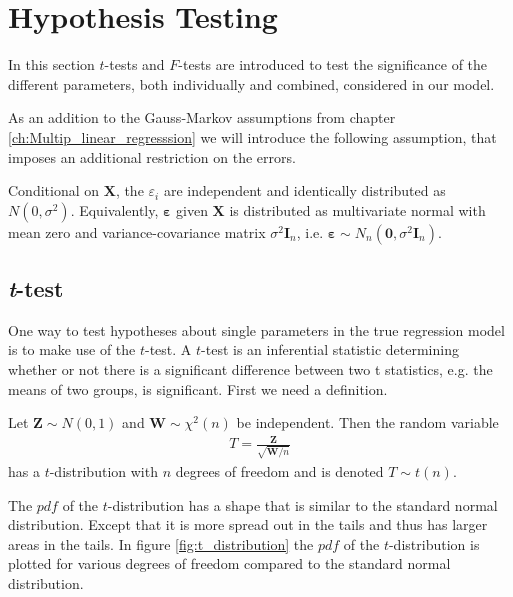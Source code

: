 \section{Hypothesis Testing}\label{sec:Hypothesis_Testing}
In this section $t$-tests and $F$-tests are introduced to test the significance of the different parameters, both individually and combined, considered in our model. 

As an addition to the Gauss-Markov assumptions from chapter \ref{ch:Multip_linear_regresssion} we will introduce the following assumption, that imposes an additional restriction on the errors. 
\begin{assumption} \label{as:normality_of_errors}
    Conditional on $\mathbf{X}$, the $\varepsilon_i$ are independent and identically distributed as $N(0, \sigma^2)$. Equivalently, $\boldsymbol{\varepsilon}$ given $\mathbf{X}$ is distributed as multivariate normal with mean zero and variance-covariance matrix $\sigma^2 \mathbf{I}_{n}$, i.e. $\boldsymbol{\varepsilon} \sim N_n(\mathbf{0}, \sigma^2 \mathbf{I}_{n})$.
\end{assumption}

\subsection{\textit{t}-test}
One way to test hypotheses about single parameters in the true regression model is to make use of the $t$-test. 
A $t$-test is an inferential statistic determining whether or not there is a significant difference between two t statistics, e.g.$\!$ the means of two groups, is significant. First we need a definition.

\begin{definition}\label{def:t_distribution}
    Let $\textbf{Z} \sim N(0,1)$ and $\textbf{W} \sim \chi^2(n)$ be independent. Then the random variable
    \begin{align*}
       T = \frac{\textbf{Z}}{\sqrt{\textbf{W}/n}}
    \end{align*}
    has a $t$-distribution with $n$ degrees of freedom and is denoted $T \sim t(n)$.
\end{definition}

The $pdf$ of the $t$-distribution has a shape that is similar to the standard normal distribution. 
Except that it is more spread out in the tails and thus has larger areas in the tails. 
In figure \ref{fig:t_distribution} the $pdf$ of the $t$-distribution is plotted for various degrees of freedom compared to the standard normal distribution. 

